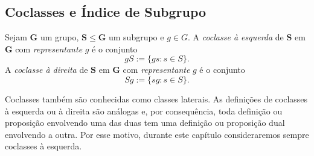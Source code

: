 \subsection{Coclasses e Índice de Subgrupo}

\begin{defi}
Sejam $\bm G$ um grupo, $\bm S \leq \bm G$ um subgrupo e $g \in G$. A \emph{coclasse à esquerda} de $\bm S$ em $\bm G$ com \emph{representante} $g$ é o conjunto
	\begin{equation*}
	gS := \{gs:s \in S\}.
	\end{equation*}
A \emph{coclasse à direita} de $\bm S$ em $\bm G$ com \emph{representante} $g$ é o conjunto
	\begin{equation*}
	Sg := \{sg:s \in S\}.
	\end{equation*}
\end{defi}

Coclasses também são conhecidas como classes laterais. As definições de coclasses à esquerda ou à direita são análogas e, por consequência, toda definição ou proposição envolvendo uma das duas tem uma definição ou proposição dual envolvendo a outra. Por esse motivo, durante este capítulo consideraremos sempre coclasses à esquerda.

